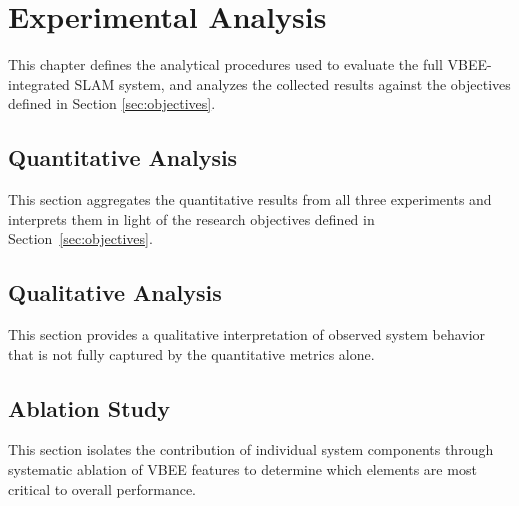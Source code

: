 \section{Experimental Analysis}
\label{sec:analysis}

This chapter defines the analytical procedures used to evaluate the full VBEE-integrated SLAM system, and analyzes the collected results against the objectives defined in Section \ref{sec:objectives}.

\subsection{Quantitative Analysis}

This section aggregates the quantitative results from all three experiments and interprets them in light of the research objectives defined in Section~\ref{sec:objectives}.

\subsection{Qualitative Analysis}

This section provides a qualitative interpretation of observed system behavior that is not fully captured by the quantitative metrics alone.

\subsection{Ablation Study}

This section isolates the contribution of individual system components through systematic ablation of VBEE features to determine which elements are most critical to overall performance.
